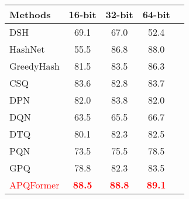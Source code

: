 \begin{table}[!htpb]
    \centering
    \begin{tabular}{cccccc}
       \\ \hline
    \multicolumn{2}{l|}{Methods} & 16-bit & 32-bit  & 64-bit   \\\hline
    \multicolumn{2}{l|}{DSH} & 69.1 & 67.0   & 52.4  \\  
    \multicolumn{2}{l|}{HashNet} & 55.5 & 86.8 & 88.0   \\  
    \multicolumn{2}{l|}{GreedyHash} & 81.5 & 83.5 & 86.3   \\  
    \multicolumn{2}{l|}{CSQ} & 83.6 & 82.8 & 83.7  \\  
    \multicolumn{2}{l|}{DPN} &  82.0 & 83.8 & 82.0   \\  
    \hline
    \hline
    \multicolumn{2}{l|}{DQN} & 63.5 & 65.5 & 66.7   \\
    \multicolumn{2}{l|}{DTQ} & 80.1 & 82.3 & 82.5   \\
    \multicolumn{2}{l|}{PQN} & 73.5 & 75.5 & 78.5  \\
    \multicolumn{2}{l|}{GPQ} & 78.8 & 82.3 & 83.5  \\
 
    \hline
    \hline
     \multicolumn{2}{l|}{\textcolor{red}{APQFormer} }&\textcolor{red}{\textbf{88.5}} & \textcolor{red}{\textbf{88.8}} & \textcolor{red}{\textbf{89.1}} \\
     \hline
     \hline
    \end{tabular}
    \label{table:cifar10apq}
  \end{table}

